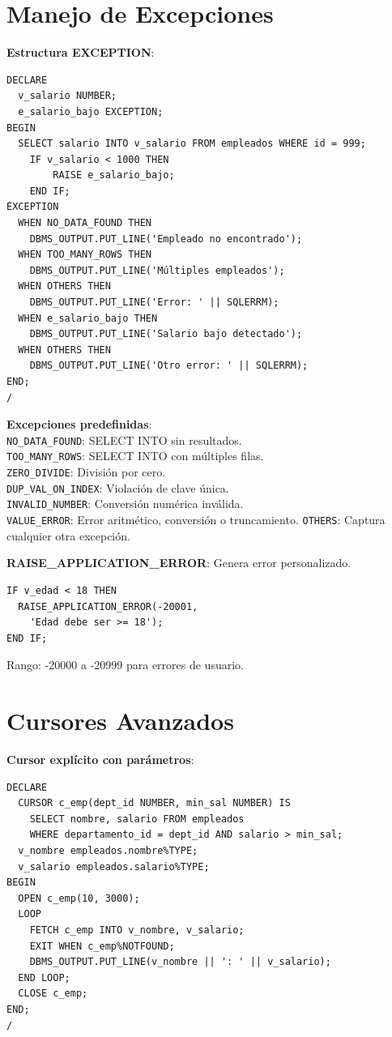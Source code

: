 \documentclass[8pt,a4paper,twocolumn]{article}
\begin{document}
\section{Manejo de Excepciones}

\textbf{Estructura EXCEPTION}:
\begin{lstlisting}
DECLARE
  v_salario NUMBER;
  e_salario_bajo EXCEPTION;
BEGIN
  SELECT salario INTO v_salario FROM empleados WHERE id = 999;
    IF v_salario < 1000 THEN
        RAISE e_salario_bajo;
    END IF;
EXCEPTION
  WHEN NO_DATA_FOUND THEN
    DBMS_OUTPUT.PUT_LINE('Empleado no encontrado');
  WHEN TOO_MANY_ROWS THEN
    DBMS_OUTPUT.PUT_LINE('Múltiples empleados');
  WHEN OTHERS THEN
    DBMS_OUTPUT.PUT_LINE('Error: ' || SQLERRM);
  WHEN e_salario_bajo THEN
    DBMS_OUTPUT.PUT_LINE('Salario bajo detectado');
  WHEN OTHERS THEN
    DBMS_OUTPUT.PUT_LINE('Otro error: ' || SQLERRM);
END;
/
\end{lstlisting}

\textbf{Excepciones predefinidas}:\\
\texttt{NO\_DATA\_FOUND}: SELECT INTO sin resultados.\\
\texttt{TOO\_MANY\_ROWS}: SELECT INTO con múltiples filas.\\
\texttt{ZERO\_DIVIDE}: División por cero.\\
\texttt{DUP\_VAL\_ON\_INDEX}: Violación de clave única.\\
\texttt{INVALID\_NUMBER}: Conversión numérica inválida.\\
\texttt{VALUE\_ERROR}: Error aritmético, conversión o truncamiento.
\texttt{OTHERS}: Captura cualquier otra excepción.

\textbf{RAISE\_APPLICATION\_ERROR}: Genera error personalizado.
\begin{lstlisting}
IF v_edad < 18 THEN
  RAISE_APPLICATION_ERROR(-20001, 
    'Edad debe ser >= 18');
END IF;
\end{lstlisting}
Rango: -20000 a -20999 para errores de usuario.

\section{Cursores Avanzados}

\textbf{Cursor explícito con parámetros}:
\begin{lstlisting}
DECLARE
  CURSOR c_emp(dept_id NUMBER, min_sal NUMBER) IS
    SELECT nombre, salario FROM empleados
    WHERE departamento_id = dept_id AND salario > min_sal;
  v_nombre empleados.nombre%TYPE;
  v_salario empleados.salario%TYPE;
BEGIN
  OPEN c_emp(10, 3000);
  LOOP
    FETCH c_emp INTO v_nombre, v_salario;
    EXIT WHEN c_emp%NOTFOUND;
    DBMS_OUTPUT.PUT_LINE(v_nombre || ': ' || v_salario);
  END LOOP;
  CLOSE c_emp;
END;
/
\end{lstlisting}
\end{document}
